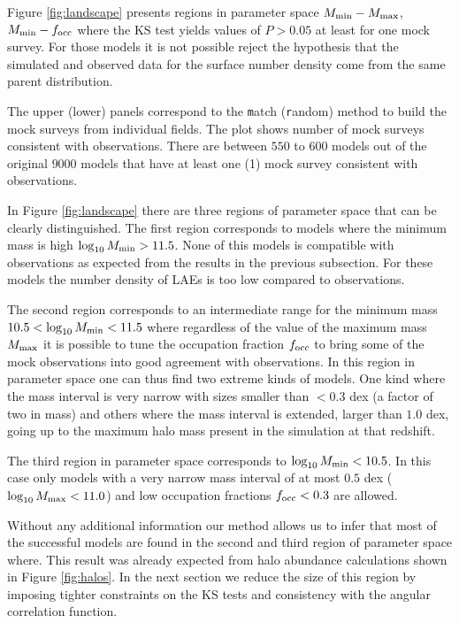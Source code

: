 \documentclass[usenatbib]{mn2e}
\begin{document}
Figure \ref{fig:landscape} presents regions in parameter space $M_{\rm
min}-M_{\rm max}$, $M_{\rm min}-f_{\rm occ}$ where the KS test yields
values of $P>0.05$ at least for one mock survey. For those models it
is not possible reject the hypothesis that the simulated and observed
data for the surface number density come from the same parent
distribution.

The upper (lower) panels correspond to the {\texttt match} ({\texttt
  random}) method to build the mock surveys from individual
fields. The plot shows number of mock surveys consistent
with observations. There are between $550$ to $600$ models out of the
original $9000$ models that have at least one (1) mock survey
consistent with observations. 


In Figure \ref{fig:landscape} there are three regions of parameter
space that can be clearly distinguished. The first region corresponds
to models where the minimum mass is high $\log_{10}M_{\rm min}>
11.5$. None of this models is compatible with observations as expected
from the results in the previous subsection. For these models the number
density of LAEs is too low compared to observations.

The second region corresponds to an intermediate range for the minimum
mass $10.5<\log_{10}M_{\rm min}<11.5$ where regardless of the value of
the maximum mass $M_{\rm max}$ it is possible to tune the occupation
fraction $f_{\rm occ}$ to bring some of the mock observations into
good agreement with observations. In this region in parameter space
one can thus find two extreme kinds of models.  One kind where the
mass interval is very narrow with sizes smaller than $<0.3$ dex (a
factor of two in mass) and others where the mass interval is 
extended, larger than $1.0$ dex, going up to the maximum halo mass
present in the simulation at that redshift. 

The third region in parameter space corresponds to $\log_{10}M_{\rm
  min}<10.5$. In this case only models with a very narrow mass interval of
at most $0.5$ dex ($\log_{10}M_{\rm max}<11.0$) and low
occupation fractions $f_{\rm occ}<0.3$ are allowed. 

Without any additional information our method allows us to infer that
most of the successful models are found in the second and third region of
parameter space where. This result was already expected from halo
abundance calculations shown in Figure \ref{fig:halos}. In the next
section we reduce the size of this region by imposing tighter
constraints on the KS tests and consistency with the angular
correlation function.
\end{document}
